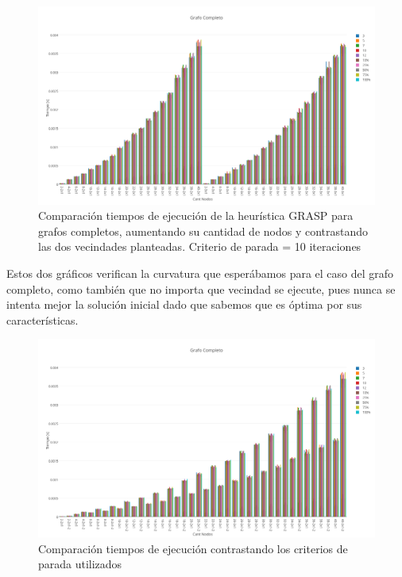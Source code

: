   \begin{figure}[h!]
   \begin{center}
 	\includegraphics[scale=0.35]{imagenes/grasp/completo-10repes.png}
 	\caption{Comparaci\'on tiempos de ejecuci\'on de la heur\'istica GRASP para grafos completos, aumentando su cantidad de nodos y contrastando las dos vecindades planteadas. Criterio de parada = 10 iteraciones}
   \end{center}
 \end{figure}
\newpage

Estos dos gr\'aficos verifican la curvatura que esper\'abamos para el caso del grafo completo, como tambi\'en que no importa que vecindad se ejecute, pues nunca se intenta mejor la soluci\'on inicial dado que sabemos que es \'optima por sus caracter\'isticas.

  \begin{figure}[h!]
   \begin{center}
 	\includegraphics[scale=0.35]{imagenes/grasp/completo-5vs10.png}
 	\caption{Comparaci\'on tiempos de ejecuci\'on contrastando los criterios de parada utilizados}
   \end{center}
 \end{figure}

